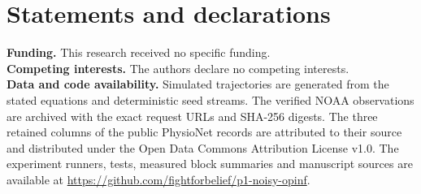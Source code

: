\documentclass[11pt,a4paper]{article}
\begin{document}
\section*{Statements and declarations}
\textbf{Funding.} This research received no specific funding.\\
\textbf{Competing interests.} The authors declare no competing interests.\\
\textbf{Data and code availability.} Simulated trajectories are generated from the stated equations and deterministic seed streams. The verified NOAA observations are archived with the exact request URLs and SHA-256 digests. The three retained columns of the public PhysioNet records are attributed to their source and distributed under the Open Data Commons Attribution License v1.0. The experiment runners, tests, measured block summaries and manuscript sources are available at \url{https://github.com/fightforbelief/p1-noisy-opinf}.
\end{document}
